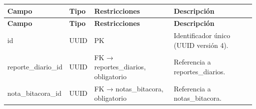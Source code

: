 \begin{xltabular}{\linewidth}{@{}>{\ttfamily\footnotesize}p{4.9cm}>{\ttfamily\footnotesize}p{2.4cm}>{\raggedright\arraybackslash\footnotesize}p{3.3cm}>{\footnotesize}X@{}}
\toprule\normalfont\sffamily\bfseries\footnotesize Campo & \normalfont\sffamily\bfseries\footnotesize Tipo & \sffamily\bfseries Restricciones & \sffamily\bfseries Descripción\\\midrule\endfirsthead
\toprule\normalfont\sffamily\bfseries\footnotesize Campo & \normalfont\sffamily\bfseries\footnotesize Tipo & \sffamily\bfseries Restricciones & \sffamily\bfseries Descripción\\\midrule\endhead
\bottomrule\endfoot
id & UUID & PK & Identificador único (UUID versión 4).\\
reporte\_diario\_id & UUID & FK → reportes\_diarios, obligatorio & Referencia a reportes\_diarios.\\
nota\_bitacora\_id & UUID & FK → notas\_bitacora, obligatorio & Referencia a notas\_bitacora.\\
\end{xltabular}

